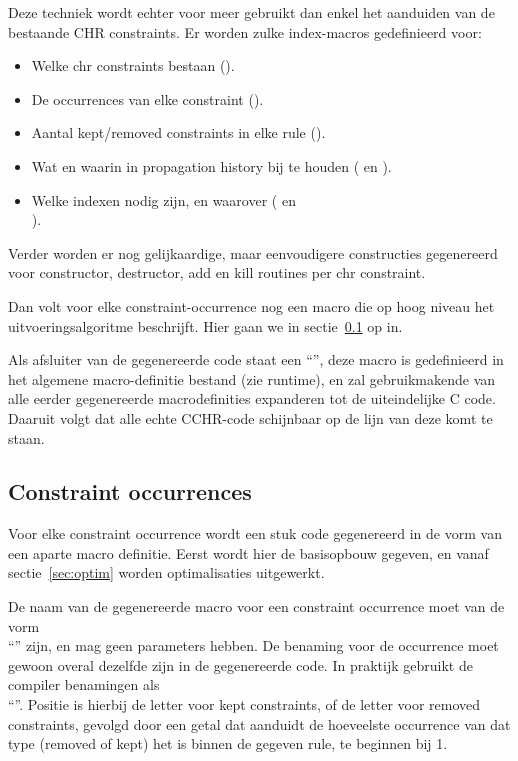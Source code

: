 Deze techniek wordt echter voor meer gebruikt dan enkel het aanduiden van de bestaande CHR constraints. Er worden zulke index-macros gedefinieerd voor: \begin{itemize}
\item Welke chr constraints bestaan ().
\item De occurrences van elke constraint ().
\item Aantal kept/removed constraints in elke rule ().
\item Wat en waarin in propagation history bij te houden ( en ).
\item Welke indexen nodig zijn, en waarover ( en \\ ).
\end{itemize}
Verder worden er nog gelijkaardige, maar eenvoudigere constructies gegenereerd voor constructor, destructor, add en kill routines per chr constraint.

Dan volt voor elke constraint-occurrence nog een macro die op hoog niveau het uitvoeringsalgoritme beschrijft. Hier gaan we in sectie~\ref{gencode-conocc} op in.

Als afsluiter van de gegenereerde code staat een ``'', deze macro is gedefinieerd in het algemene macro-definitie bestand (zie runtime), en zal gebruikmakende van alle eerder gegenereerde macrodefinities expanderen tot de uiteindelijke C code. Daaruit volgt dat alle echte CCHR-code schijnbaar op de lijn van deze  komt te staan.

\subsection{Constraint occurrences} \label{gencode-conocc}

Voor elke constraint occurrence wordt een stuk code gegenereerd in de vorm van een aparte macro definitie. Eerst wordt hier de basisopbouw gegeven, en vanaf sectie~\ref{sec:optim} worden optimalisaties uitgewerkt.

De naam van de gegenereerde macro voor een constraint occurrence moet van de vorm \\ ``'' zijn, en mag geen parameters hebben. De benaming voor de occurrence moet gewoon overal dezelfde zijn in de gegenereerde code. In praktijk gebruikt de compiler benamingen als \\ ``''. Positie is hierbij de letter  voor kept constraints, of de letter  voor removed constraints, gevolgd door een getal dat aanduidt de hoeveelste occurrence van dat type (removed of kept) het is binnen de gegeven rule, te beginnen bij 1.

